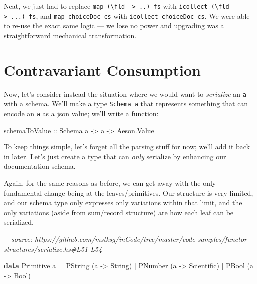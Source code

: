 \documentclass[]{article}
\newenvironment{Shaded}{}{}
\newcommand{\CommentTok}[1]{\textcolor[rgb]{0.38,0.63,0.69}{\textit{#1}}}
\newcommand{\DataTypeTok}[1]{\textcolor[rgb]{0.56,0.13,0.00}{#1}}
\newcommand{\KeywordTok}[1]{\textcolor[rgb]{0.00,0.44,0.13}{\textbf{#1}}}
\newcommand{\NormalTok}[1]{#1}
\newcommand{\OperatorTok}[1]{\textcolor[rgb]{0.40,0.40,0.40}{#1}}
\newcommand{\OtherTok}[1]{\textcolor[rgb]{0.00,0.44,0.13}{#1}}
\begin{document}
Neat, we just had to replace
\texttt{map\ (\textbackslash{}fld\ -\textgreater{}\ ..)\ fs} with
\texttt{icollect\ (\textbackslash{}fld\ -\textgreater{}\ ...)\ fs}, and
\texttt{map\ choiceDoc\ cs} with \texttt{icollect\ choiceDoc\ cs}. We were able
to re-use the exact same logic --- we lose no power and upgrading was a
straightforward mechanical transformation.

\hypertarget{contravariant-consumption}{%
\section{Contravariant Consumption}\label{contravariant-consumption}}

Now, let's consider instead the situation where we would want to
\emph{serialize} an \texttt{a} with a schema. We'll make a type
\texttt{Schema\ a} that represents something that can encode an \texttt{a} as a
json value; we'll write a function:

\begin{Shaded}
\begin{Highlighting}[]
\OtherTok{schemaToValue ::} \DataTypeTok{Schema}\NormalTok{ a }\OtherTok{{-}>}\NormalTok{ a }\OtherTok{{-}>} \DataTypeTok{Aeson.Value}
\end{Highlighting}
\end{Shaded}

To keep things simple, let's forget all the parsing stuff for now; we'll add it
back in later. Let's just create a type that can \emph{only} serialize by
enhancing our documentation schema.

Again, for the same reasons as before, we can get away with the only fundamental
change being at the leaves/primitives. Our structure is very limited, and our
schema type only expresses only variations within that limit, and the only
variations (aside from sum/record structure) are how each leaf can be
serialized.

\begin{Shaded}
\begin{Highlighting}[]
\CommentTok{{-}{-} source: https://github.com/mstksg/inCode/tree/master/code{-}samples/functor{-}structures/serialize.hs\#L51{-}L54}

\KeywordTok{data} \DataTypeTok{Primitive}\NormalTok{ a }\OtherTok{=}
      \DataTypeTok{PString}\NormalTok{ (a }\OtherTok{{-}>} \DataTypeTok{String}\NormalTok{)}
    \OperatorTok{|} \DataTypeTok{PNumber}\NormalTok{ (a }\OtherTok{{-}>} \DataTypeTok{Scientific}\NormalTok{)}
    \OperatorTok{|} \DataTypeTok{PBool}\NormalTok{   (a }\OtherTok{{-}>} \DataTypeTok{Bool}\NormalTok{)}
\end{Highlighting}
\end{Shaded}
\end{document}
